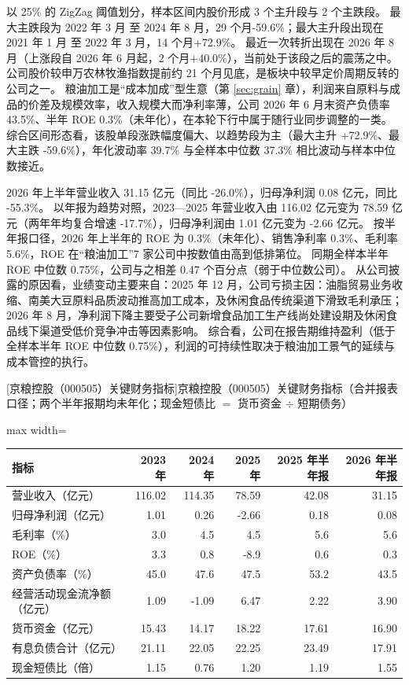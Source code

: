 以 25\% 的 ZigZag 阈值划分，样本区间内股价形成 3 个主升段与 2 个主跌段。 最大主跌段为 2022 年 3 月 至 2024 年 8 月，29 个月-59.6\%；最大主升段出现在 2021 年 1 月 至 2022 年 3 月，14 个月+72.9\%。 最近一次转折出现在 2026 年 8 月（上涨段自 2026 年 6 月起，2 个月+40.0\%），当前处于该段之后的震荡之中。 公司股价较申万农林牧渔指数提前约 21 个月见底，是板块中较早定价周期反转的公司之一。 粮油加工是“成本加成”型生意（第 \ref{sec:grain} 章），利润来自原料与成品的价差及规模效率，收入规模大而净利率薄，公司 2026 年 6 月末资产负债率 43.5\%、半年 ROE 0.3\%（未年化），在本轮下行中属于随行业同步调整的一类。 综合区间形态看，该股单段涨跌幅度偏大、以趋势段为主（最大主升 +72.9\%、最大主跌 -59.6\%），年化波动率 39.7\% 与全样本中位数 37.3\% 相比波动与样本中位数接近。

 2026 年上半年营业收入 31.15 亿元（同比 -26.0\%），归母净利润 0.08 亿元，同比 -55.3\%。 以年报为趋势对照，2023---2025 年营业收入由 116.02 亿元变为 78.59 亿元（两年年均复合增速 -17.7\%），归母净利润由 1.01 亿元变为 -2.66 亿元。 按半年报口径，2026 年上半年的 ROE 为 0.3\%（未年化）、销售净利率 0.3\%、毛利率 5.6\%，ROE 在“粮油加工”7 家公司中按数值由高到低排第位。 同期全样本半年 ROE 中位数 0.75\%，公司与之相差 0.47 个百分点（弱于中位数公司）。 从公司披露的原因看，业绩变动主要来自：2025 年 12 月，公司亏损主因：油脂贸易业务收缩、南美大豆原料品质波动推高加工成本，及休闲食品传统渠道下滑致毛利承压；2026 年 8 月，净利润下降主要受子公司新增食品加工生产线尚处建设期及休闲食品线下渠道受低价竞争冲击等因素影响。 综合看，公司在报告期维持盈利（低于全样本半年 ROE 中位数 0.75\%），利润的可持续性取决于粮油加工景气的延续与成本管控的执行。

\begin{center}\small\setlength{\tabcolsep}{3.4pt}
[京粮控股（000505）关键财务指标]{京粮控股（000505）关键财务指标（合并报表口径；两个半年报期均未年化；现金短债比 $=$ 货币资金 $\div$ 短期债务）}
\begin{adjustbox}{max width=\textwidth}
\begin{tabular}{@{}lrrrrr@{}}
\toprule
指标 & 2023 年 & 2024 年 & 2025 年 & 2025 年半年报 & 2026 年半年报 \\
\midrule
营业收入（亿元） & 116.02 & 114.35 & 78.59 & 42.08 & 31.15 \\
归母净利润（亿元） & 1.01 & 0.26 & -2.66 & 0.18 & 0.08 \\
毛利率（\%） & 3.0 & 4.5 & 4.5 & 5.6 & 5.6 \\
ROE（\%） & 3.3 & 0.8 & -8.9 & 0.6 & 0.3 \\
资产负债率（\%） & 45.0 & 47.6 & 47.5 & 53.2 & 43.5 \\
经营活动现金流净额（亿元） & 1.09 & -1.09 & 6.47 & 2.22 & 3.90 \\
货币资金（亿元） & 15.43 & 14.17 & 18.22 & 17.61 & 16.90 \\
有息负债合计（亿元） & 21.11 & 22.05 & 22.25 & 23.49 & 17.91 \\
现金短债比（倍） & 1.15 & 0.76 & 1.20 & 1.19 & 1.55 \\
\bottomrule
\end{tabular}
\end{adjustbox}
\end{center}

